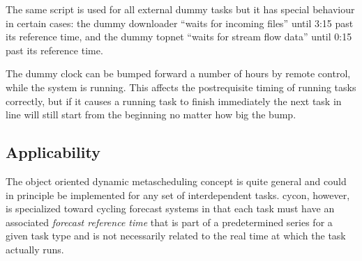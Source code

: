 \documentclass[11pt,a4paper]{article}
\begin{document}
The same script is used for all external dummy tasks but it has special
behaviour in certain cases: the dummy downloader ``waits for incoming
files'' until 3:15 past its reference time, and the dummy topnet ``waits
for stream flow data'' until 0:15 past its reference time.

The dummy clock can be bumped forward a number of hours by remote
control, while the system is running. This affects the postrequisite
timing of running tasks correctly, but if it causes a running task to
finish immediately the next task in line will still start from the
beginning no matter how big the bump.







\subsection{Applicability}

The object oriented dynamic metascheduling concept is quite general and
could in principle be implemented for any set of interdependent tasks.
cycon, however, is specialized toward cycling forecast systems in that
each task must have an associated {\em forecast reference time} that is
part of a predetermined series for a given task type and is not
necessarily related to the real time at which the task actually runs.  
\end{document}
